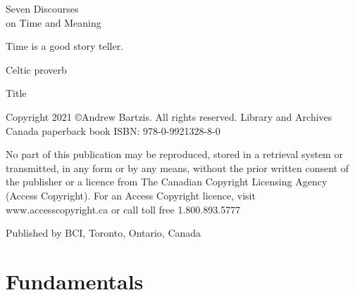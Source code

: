 \documentclass[letterpaper,10pt,twoside,titlepage,onecolumn,openany]{book}
\begin{document}
\newpage{}
\thispagestyle{empty}

\vspace{30mm}

\begin{center}
\huge{Seven Discourses\\
on Time and Meaning}
\large{}
\end{center}

\vspace{10mm}


\newpage




\begin{center}


\end{center}

\vspace{5mm}
\begin{center}

Time is a good story teller.


Celtic proverb

\end{center}

\newpage
\thispagestyle{empty}



\begin{center}



\large{Title}

\end{center}




\vspace{5mm}
\noindent
Copyright 2021  \copyright Andrew Bartzis. All rights reserved.
Library and Archives Canada paperback book ISBN: 978-0-9921328-8-0


\vspace{5mm}
\noindent
No part of this publication may be reproduced, stored in a retrieval system or transmitted, in any form or by any means, without the prior written consent of the publisher or a licence from The Canadian Copyright Licensing Agency (Access Copyright). For an Access Copyright licence, visit www.accesscopyright.ca or call toll free 1.800.893.5777


\vspace{5mm}
\noindent
Published by BCI, Toronto, Ontario, Canada





\tableofcontents

\part{Fundamentals}
\end{document}
